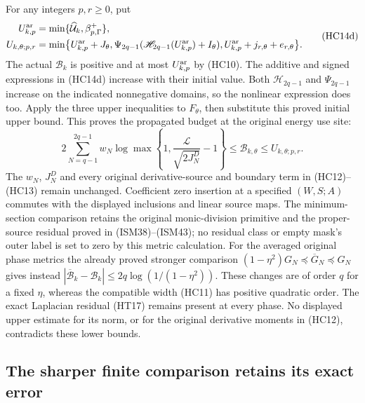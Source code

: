 For any integers $p,r\geq0$, put
\[
\begin{split}
 U_{k,p}^{\rm ar}&=\min\{\widehat{\mathcal U}_k,
                                       \beta_{p,\Gamma}^+\},\\
 U_{k,\theta;p,r}&=\min\bigl\{
 U_{k,p}^{\rm ar}+J_\theta,
 \Psi_{2q-1}(\mathscr H_{2q-1}(U_{k,p}^{\rm ar})+I_\theta),
 U_{k,p}^{\rm ar}+j_{r,\theta}+e_{r,\theta}\bigr\}.
\end{split}
\tag{HC14d}
\]
The actual $\mathcal B_k$ is positive and at most $U_{k,p}^{\rm ar}$
by (HC10). The additive and signed expressions in (HC14d) increase
with their initial value. Both $\mathscr H_{2q-1}$ and
$\Psi_{2q-1}$ increase on the indicated nonnegative domains, so
the nonlinear expression does too. Apply the three upper inequalities
to $F_\theta$, then substitute this proved initial upper bound.
This proves the propagated budget at the original energy use site:
\[
 2\sum_{N=q-1}^{2q-1}w_N
 \log\max\left\{1,\frac{\mathcal L}{\sqrt{2J_N^D}}-1\right\}
 \leq\mathcal B_{k,\theta}\leq U_{k,\theta;p,r}.
\tag{HC13a}
\]
The $w_N$, $J_N^D$ and every original derivative-source and boundary
term in (HC12)--(HC13) remain unchanged. Coefficient zero insertion
at a specified $(W,S;A)$ commutes with the displayed inclusions and
linear source maps. The minimum-section comparison retains the
original monic-division primitive and the proper-source residual
proved in (ISM38)--(ISM43); no residual class or empty mask's outer
label is set to zero by this metric calculation.
For the averaged original phase metrics the already proved stronger
comparison $(1-\eta^2)G_N\preceq\overline G_N\preceq G_N$ gives instead
$|\overline{\mathcal B}_k-\mathcal B_k|
\leq2q\log(1/(1-\eta^2))$.  These changes are of order $q$ for a fixed
$\eta$, whereas the compatible width (HC11) has positive quadratic
order.  The exact Laplacian residual (HT17) remains present at every
phase.  No displayed upper estimate for its norm, or for the original
derivative moments in (HC12), contradicts these lower bounds.

\subsection{The sharper finite comparison retains its exact error}

